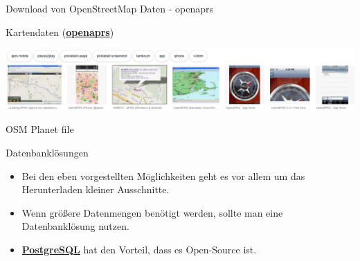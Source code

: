 \documentclass[ignorenonframetext,]{beamer}
\providecommand{\tightlist}{%
  \setlength{\itemsep}{0pt}\setlength{\parskip}{0pt}}
\begin{document}
\begin{frame}{Download von OpenStreetMap Daten - openaprs}
\protect\hypertarget{download-von-openstreetmap-daten---openaprs}{}

\begin{block}{Kartendaten
(\href{http://www.openaprs.net/}{\textbf{openaprs}})}

\includegraphics{figure/openaprs.PNG}

\end{block}

\end{frame}

\begin{frame}{OSM Planet file}
\protect\hypertarget{osm-planet-file}{}

\begin{block}{Datenbanklösungen}

\begin{itemize}
\tightlist
\item
  Bei den eben vorgestellten Möglichkeiten geht es vor allem um das
  Herunterladen kleiner Ausschnitte.
\item
  Wenn größere Datenmengen benötigt werden, sollte man eine
  Datenbanklösung nutzen.
\item
  \href{http://www.postgresql.org/}{\textbf{PostgreSQL}} hat den
  Vorteil, dass es Open-Source ist.
\end{itemize}

\end{block}

\end{frame}
\end{document}
